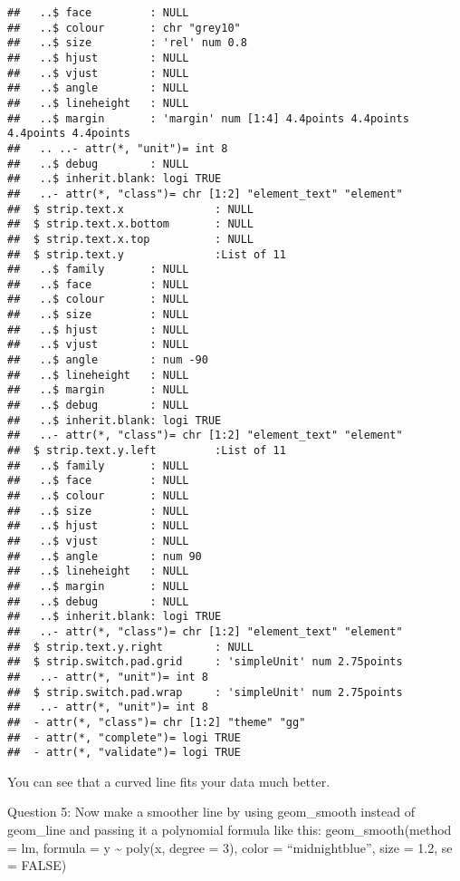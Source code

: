 \documentclass[
]{article}
\begin{document}
\begin{verbatim}
##   ..$ face         : NULL
##   ..$ colour       : chr "grey10"
##   ..$ size         : 'rel' num 0.8
##   ..$ hjust        : NULL
##   ..$ vjust        : NULL
##   ..$ angle        : NULL
##   ..$ lineheight   : NULL
##   ..$ margin       : 'margin' num [1:4] 4.4points 4.4points 4.4points 4.4points
##   .. ..- attr(*, "unit")= int 8
##   ..$ debug        : NULL
##   ..$ inherit.blank: logi TRUE
##   ..- attr(*, "class")= chr [1:2] "element_text" "element"
##  $ strip.text.x              : NULL
##  $ strip.text.x.bottom       : NULL
##  $ strip.text.x.top          : NULL
##  $ strip.text.y              :List of 11
##   ..$ family       : NULL
##   ..$ face         : NULL
##   ..$ colour       : NULL
##   ..$ size         : NULL
##   ..$ hjust        : NULL
##   ..$ vjust        : NULL
##   ..$ angle        : num -90
##   ..$ lineheight   : NULL
##   ..$ margin       : NULL
##   ..$ debug        : NULL
##   ..$ inherit.blank: logi TRUE
##   ..- attr(*, "class")= chr [1:2] "element_text" "element"
##  $ strip.text.y.left         :List of 11
##   ..$ family       : NULL
##   ..$ face         : NULL
##   ..$ colour       : NULL
##   ..$ size         : NULL
##   ..$ hjust        : NULL
##   ..$ vjust        : NULL
##   ..$ angle        : num 90
##   ..$ lineheight   : NULL
##   ..$ margin       : NULL
##   ..$ debug        : NULL
##   ..$ inherit.blank: logi TRUE
##   ..- attr(*, "class")= chr [1:2] "element_text" "element"
##  $ strip.text.y.right        : NULL
##  $ strip.switch.pad.grid     : 'simpleUnit' num 2.75points
##   ..- attr(*, "unit")= int 8
##  $ strip.switch.pad.wrap     : 'simpleUnit' num 2.75points
##   ..- attr(*, "unit")= int 8
##  - attr(*, "class")= chr [1:2] "theme" "gg"
##  - attr(*, "complete")= logi TRUE
##  - attr(*, "validate")= logi TRUE
\end{verbatim}

You can see that a curved line fits your data much better.

Question 5: Now make a smoother line by using geom\_smooth instead of
geom\_line and passing it a polynomial formula like this:
geom\_smooth(method = lm, formula = y \textasciitilde{} poly(x, degree =
3), color = ``midnightblue'', size = 1.2, se = FALSE)
\end{document}
